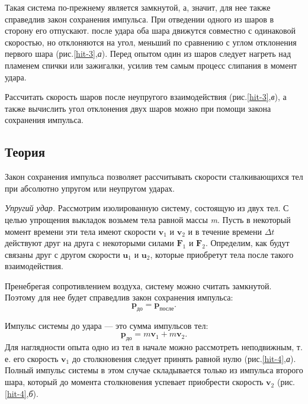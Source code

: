 \documentclass[All.tex]{subfiles}
\begin{document}
Такая система по-прежнему является замкнутой, а, значит, для нее также справедлив закон сохранения импульса.
При отведении одного из шаров в сторону его отпускают.
после удара оба шара движутся совместно с одинаковой скоростью, но отклоняются на угол, меньший по сравнению с углом отклонения первого шара (рис.\ref{hit-3},\textit{а}).
Перед опытом один из шаров следует нагреть над пламенем спички или зажигалки, усилив тем самым процесс слипания в момент удара.

Рассчитать скорость шаров после неупругого взаимодействия (рис.\ref{hit-3},\textit{в}), а также вычислить угол отклонения двух шаров можно при помощи закона сохранения импульса.

\subsection*{\textcolor{PineGreen}{Теория}}

Закон сохранения импульса позволяет рассчитывать скорости сталкивающихся тел при абсолютно упругом или неупругом ударах.

\textit{Упругий удар.}
Рассмотрим изолированную систему, состоящую из двух тел.
С целью упрощения выкладок возьмем тела равной массы \textit{m}.
Пусть в некоторый момент времени эти тела имеют скорости $ \textbf{v}_1 $ и  $ \textbf{v}_2 $ и в течение 
времени $ \Delta t $ действуют друг на друга с некоторыми силами $ \textbf{F}_1 $ и $ \textbf{F}_2 $.
Определим, как будут связаны друг с другом скорости $ \textbf{u}_1 $ и $ \textbf{u}_2 $, которые приобретут 
тела после такого взаимодействия.

Пренебрегая сопротивлением воздуха, систему можно считать замкнутой.
Поэтому для нее будет справедлив закон сохранения импульса:
	\begin{equation}\label{hit-1eq1}
\textbf{p}_{\text{до}}  = \textbf{p}_{\text{после}}.
\end{equation}

Импульс системы до удара — это сумма импульсов тел:
	\begin{equation}\label{hit-1eq2}
\textbf{p}_{\text{до}}  = m \textbf{v}_1 + m \textbf{v}_2.
\end{equation}
Для наглядности опыта одно из тел в начале можно рассмотреть неподвижным, т. е. его скорость $ \textbf{v}_1 $ до столкновения следует принять равной нулю (рис.\ref{hit-4},\textit{а}).
Полный импульс системы в этом случае складывается только из импульса второго шара, который до момента столкновения успевает приобрести скорость $ \textbf{v}_2 $ (рис.\ref{hit-4},\textit{б}).
\end{document}
